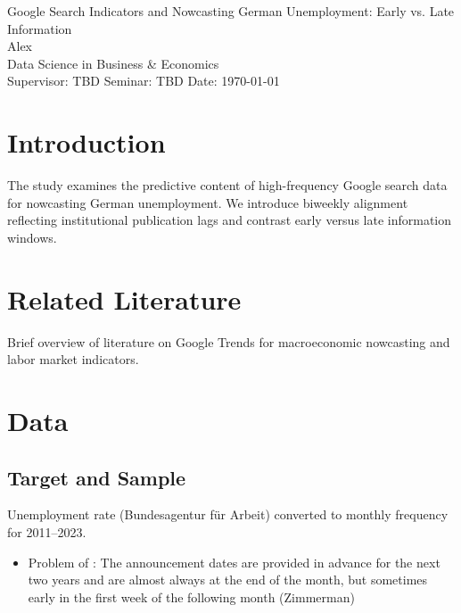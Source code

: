 \documentclass[11pt,a4paper]{article}
\newcommand{\Wtwl}{\text{W12}}
\newcommand{\Wthfo}{\text{W34}}
\begin{document}
\begin{center}
{\LARGE Google Search Indicators and Nowcasting German Unemployment: Early vs. Late Information}\\[0.5em]
{\large Alex \\ Data Science in Business \& Economics}\\[0.25em]
{\small Supervisor: TBD \quad Seminar: TBD \quad Date: \today}
\end{center}
\vspace{1em}

\begin{abstract}
This paper evaluates whether Google search indicators aligned to institutional reporting windows improve one-step-ahead nowcasts of German unemployment relative to autoregressive benchmarks. Weekly search series (Indeed, Stepstone, Jobbörse, Arbeitsamt, Bewerbung) are stitched to consistent 2011--2023 histories and aggregated to bi-weekly components reflecting \Wthfo{} (M−1) and \Wtwl{} (M). We compare early vs. late nowcasts and assess gains via out-of-sample RMSE/MAE and Diebold–Mariano tests.
\end{abstract}

\section{Introduction}
The study examines the predictive content of high-frequency Google search data for nowcasting German unemployment. We introduce biweekly alignment reflecting institutional publication lags and contrast early versus late information windows.

\section{Related Literature}
Brief overview of literature on Google Trends for macroeconomic nowcasting and labor market indicators.

\section{Data}
\subsection{Target and Sample}
Unemployment rate (Bundesagentur für Arbeit) converted to monthly frequency for 2011--2023.
\begin{itemize}
    \item Problem of : The
announcement dates are provided in advance for the next two years and are almost always at the
end of the month, but sometimes early in the first week of the following month (Zimmerman)
\end{itemize}
\end{document}
